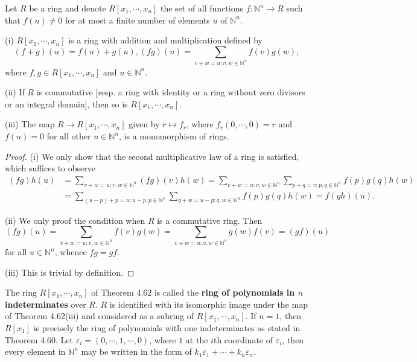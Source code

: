 \begin{theorem}
Let $R$ be a ring and denote $R[x_1,\cdots,x_n]$ the set of all functions $f:\mathbb{N}^n\to R$ such that $f(u)\ne 0$ for at most a finite number of elements $u$ of $\mathbb{N}^n$.\par
(i) $R[x_1,\cdots,x_n]$ is a ring with addition and multiplication defined by 
$$
\left( f+g \right) \left( u \right) =f\left( u \right) +g\left( u \right) ,\left( fg \right) \left( u \right) =\sum_{v+w=u;v,w\in \mathbb{N} ^n}{f\left( v \right) g\left( w \right)},
$$
where $f,g\in R[x_1,\cdots,x_n]$ and $u\in\mathbb{N}^n$.\par
(ii) If $R$ is commutative [resp. a ring with identity or a ring without zero divisors or an integral domain], then so is $R[x_1,\cdots,x_n]$.\par
(iii) The map $R\to R[x_1,\cdots,x_n]$ given by $r\mapsto f_r$, where $f_r(0,\cdots,0)=r$ and $f(u)=0$ for all other $u\in\mathbb{N}^n$, is a monomorphism of rings.
\end{theorem}
\begin{proof}
(i) We only show that the second multiplicative law of a ring is satisfied, which suffices to observe 
$$
\begin{aligned}
\left( fg \right) h\left( u \right) &=\sum_{v+w=u;v,w\in \mathbb{N} ^n}{\left( fg \right) \left( v \right) h\left( w \right)}=\sum_{v+w=u;v,w\in \mathbb{N} ^n}{\sum_{p+q=v;p,q\in \mathbb{N} ^n}{f\left( p \right) g\left( q \right) h\left( w \right)}}
\\
&=\sum_{\left( u-p \right) +p=u;u-p,p\in \mathbb{N} ^n}{\sum_{q+w=u-p;q,w\in \mathbb{N} ^n}{f\left( p \right) g\left( q \right) h\left( w \right)}}=f\left( gh \right) \left( u \right) .
\end{aligned}
$$\par
(ii) We only proof the condition when $R$ is a commutative ring. Then 
$$
\left( fg \right) \left( u \right) =\sum_{v+w=u;v,w\in \mathbb{N} ^n}{f\left( v \right) g\left( w \right)}=\sum_{v+w=u;v,w\in \mathbb{N} ^n}{g\left( w \right) f\left( v \right)}=\left( gf \right) \left( u \right) 
$$
for all $u\in\mathbb{N}^n$, whence $fg=gf$.\par
(iii) This is trivial by definition.
\end{proof}
The ring $R[x_1,\cdots,x_n]$ of Theorem 4.62 is called the \textbf{ring of polynomials in $n$ indeterminates} over $R$. $R$ is identified with its isomorphic image under the map of Theorem 4.62(iii) and considered as a subring of $R[x_1,\cdots,x_n]$. If $n=1$, then $R[x_1]$ is precisely the ring of polynomials with one indeterminates as stated in Theorem 4.60. Let $\varepsilon_i=(0,\cdots,1,\cdots,0)$, where $1$ at the $i$th coordinate of $\varepsilon_i$, then every element in $\mathbb{N}^n$ may be written in the form of $k_1\varepsilon_1+\cdots+k_n\varepsilon_n$.\par
